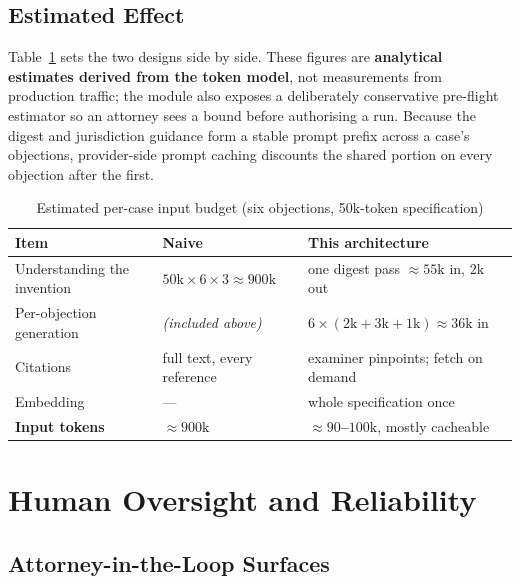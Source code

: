 \documentclass[conference]{IEEEtran}
\begin{document}
\subsection{Estimated Effect}

Table~\ref{tab:cost} sets the two designs side by side. These figures are \textbf{analytical estimates derived from the token model}, not measurements from production traffic; the module also exposes a deliberately conservative pre-flight estimator so an attorney sees a bound before authorising a run. Because the digest and jurisdiction guidance form a stable prompt prefix across a case's objections, provider-side prompt caching discounts the shared portion on every objection after the first.

\begin{table}[h]
\caption{Estimated per-case input budget (six objections, 50k-token specification)}
\label{tab:cost}
\centering
\footnotesize
\renewcommand{\arraystretch}{1.25}
\begin{tabular}{@{}>{\raggedright\arraybackslash}p{}>{\raggedright\arraybackslash}p{}>{\raggedright\arraybackslash}p{}@{}}
\toprule
\textbf{Item} & \textbf{Naive} & \textbf{This architecture} \\
\midrule
Understanding the invention & $50\mathrm{k}\times6\times3 \approx 900\mathrm{k}$ & one digest pass $\approx55\mathrm{k}$ in, $2\mathrm{k}$ out \\
Per-objection generation & \emph{(included above)} & $6\times(2\mathrm{k}+3\mathrm{k}+1\mathrm{k})\approx36\mathrm{k}$ in \\
Citations & full text, every reference & examiner pinpoints; fetch on demand \\
Embedding & --- & whole specification once \\
\midrule
\textbf{Input tokens} & \textbf{$\approx900\mathrm{k}$} & \textbf{$\approx90$--$100\mathrm{k}$}, mostly cacheable \\
\bottomrule
\end{tabular}
\end{table}

\section{Human Oversight and Reliability}

\subsection{Attorney-in-the-Loop Surfaces}
\end{document}
